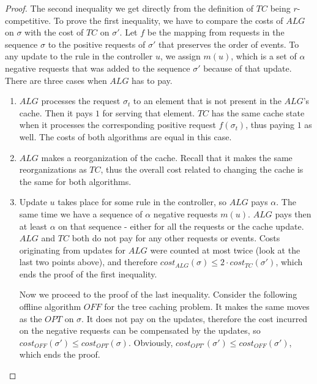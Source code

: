 \begin{proof} The second inequality we get directly from the definition of $TC$
being $r$-competitive. To prove the first inequality, we have to compare the
costs of $ALG$ on $\sigma$ with the cost of $TC$ on $\sigma'$. Let $f$ be the
mapping from requests in the sequence $\sigma$ to the positive requests of
$\sigma'$ that preserves the order of events. To any update to the 
rule in the controller $u$, we assign $m(u)$, which is a set of $\alpha$ negative
requests that was added to the sequence $\sigma'$ because of that update. There
are three cases when $ALG$ has to pay. \begin{enumerate} \item $ALG$ processes
the request $\sigma_t$ to an element that is not present in the $ALG$'s cache.
Then it pays $1$ for serving that element. $TC$ has the same cache state when it
processes the corresponding positive request $f(\sigma_t)$, thus paying $1$ as well.
The costs of both algorithms are equal in this case. \item $ALG$ makes a
reorganization of the cache. Recall that it makes the same reorganizations as
$TC$, thus the overall cost related to changing the cache is the same for both
algorithms. \item Update $u$ takes place for some rule in the controller, so
$ALG$ pays $\alpha$. The same time we have a sequence of $\alpha$ negative
requests $m(u)$. $ALG$ pays then at least $\alpha$ on that sequence - either for
all the requests or the cache update. $ALG$ and $TC$ both do not pay for any
other requests or events. Costs originating from updates for $ALG$ were counted
at most twice (look at the last two points above), and therefore $cost_{ALG}(\sigma)
\leq 2 \cdot cost_{TC}(\sigma')$, which ends the proof of the first inequality.

Now we proceed to the proof of the last inequality. Consider the following
offline algorithm $OFF$ for the tree caching problem. It makes the same moves as
the $OPT$ on $\sigma$. It does not pay on the updates, therefore the cost
incurred on the negative requests can be compensated by the updates, so
$cost_{OFF}(\sigma') \leq cost_{OPT}(\sigma)$. Obviously, $cost_{OPT'}(\sigma')
\leq cost_{OFF}(\sigma')$, which ends the proof.  \end{enumerate} \end{proof}
